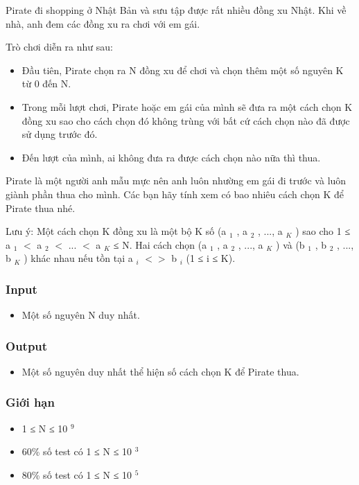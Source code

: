 



   Pirate đi shopping ở Nhật Bản và sưu tập được rất nhiều đồng xu Nhật. Khi về nhà, anh đem các đồng xu ra chơi với em gái.  

   Trò chơi diễn ra như sau:  
\begin{itemize}
	\item     Đầu tiên, Pirate chọn ra N đồng xu để chơi và chọn thêm một số nguyên K từ 0 đến N.   
	\item     Trong mỗi lượt chơi, Pirate hoặc em gái của mình sẽ đưa ra một cách chọn K đồng xu sao cho cách chọn đó không trùng với bất cứ cách chọn nào đã được sử dụng trước đó.   
	\item     Đến lượt của mình, ai không đưa ra được cách chọn nào nữa thì thua.   
\end{itemize}

   Pirate là một người anh mẫu mực nên anh luôn nhường em gái đi trước và luôn giành phần thua cho mình. Các bạn hãy tính xem có bao nhiêu cách chọn K để Pirate thua nhé.  

   Lưu ý: Một cách chọn K đồng xu là một bộ K số (a   $_    1   $   , a   $_    2   $   , ..., a   $_    K   $   ) sao cho 1 ≤ a   $_    1   $   $<$ a   $_    2   $   $<$ ... $<$ a   $_    K   $   ≤ N. Hai cách chọn (a   $_    1   $   , a   $_    2   $   , ..., a   $_    K   $   ) và (b   $_    1   $   , b   $_    2   $   , ..., b   $_    K   $   ) khác nhau nếu tồn tại a   $_    i   $   $<$$>$ b   $_    i   $   (1 ≤ i ≤ K).  

\subsubsection{   Input  }
\begin{itemize}
	\item     Một số nguyên N duy nhất.   
\end{itemize}

\subsubsection{   Output  }
\begin{itemize}
	\item     Một số nguyên duy nhất thể hiện số cách chọn K để Pirate thua.   
\end{itemize}

\subsubsection{   Giới hạn  }
\begin{itemize}
	\item     1 ≤ N ≤ 10    $^     9    $
	\item     60\% số test có 1 ≤ N ≤ 10    $^     3    $
	\item     80\% số test có 1 ≤ N ≤ 10    $^     5    $
\end{itemize}

